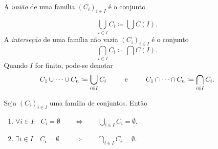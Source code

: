 \begin{defi}
A \emph{união} de uma família $(C_i)_{i \in I}$ é o conjunto
\end{defi}
	\begin{equation*}
	\bigcup_{i \in I} C_i \coloneqq \bigcup C(I).
	\end{equation*}
A \emph{interseção} de uma família não vazia $(C_i)_{i \in I}$ é o conjunto
	\begin{equation*}
	\bigcap_{i \in I} C_i \coloneqq \bigcap C(I).
	\end{equation*}
\noindent
Quando $I$ for finito, pode-se denotar
	\begin{equation*}
	C_1 \cup \cdots \cup C_n \coloneqq \bigcup_{i \in I} C_i \qquad \text{\ \ e\ \ } \qquad C_1 \cap \cdots \cap C_n \coloneqq \bigcap_{i \in I} C_i.
	\end{equation*}
	
\begin{prop}
	Seja $(C_i)_{i \in I}$ uma família de conjuntos. Então
	\begin{enumerate}
	\item $\forall i \in I \quad C_i = \emptyset \qquad \Leftrightarrow \qquad \displaystyle \bigcup_{i \in I} C_i = \emptyset$.
	
	\item $\displaystyle \exists i \in I \quad C_i = \emptyset \qquad \Rightarrow \qquad \bigcap_{i \in I} C_i = \emptyset$.
	\end{enumerate}
\end{prop}

